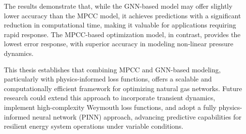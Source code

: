 The results demonstrate that, while the GNN-based model may offer slightly lower accuracy than the MPCC model, it achieves predictions with a significant reduction in computational time, making it valuable for applications requiring rapid response. The MPCC-based optimization model, in contrast, provides the lowest error response, with superior accuracy in modeling non-linear pressure dynamics. 

This thesis establishes that combining MPCC and GNN-based modeling, particularly with physics-informed loss functions, offers a scalable and computationally efficient framework for optimizing natural gas networks. Future research could extend this approach to incorporate transient dynamics, implement high-complexity Weymouth loss functions, and adopt a fully physics-informed neural network (PINN) approach, advancing predictive capabilities for resilient energy system operations under variable conditions.



